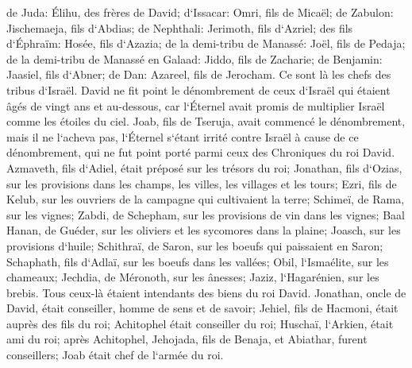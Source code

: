 \verse de Juda: Élihu, des frères de David; d`Issacar: Omri, fils de Micaël; 
\verse de Zabulon: Jischemaeja, fils d`Abdias; de Nephthali: Jerimoth, fils d`Azriel; 
\verse des fils d`Éphraïm: Hosée, fils d`Azazia; de la demi-tribu de Manassé: Joël, fils de Pedaja; 
\verse de la demi-tribu de Manassé en Galaad: Jiddo, fils de Zacharie; de Benjamin: Jaasiel, fils d`Abner; 
\verse de Dan: Azareel, fils de Jerocham. Ce sont là les chefs des tribus d`Israël. 
\verse David ne fit point le dénombrement de ceux d`Israël qui étaient âgés de vingt ans et au-dessous, car l`Éternel avait promis de multiplier Israël comme les étoiles du ciel. 
\verse Joab, fils de Tseruja, avait commencé le dénombrement, mais il ne l`acheva pas, l`Éternel s`étant irrité contre Israël à cause de ce dénombrement, qui ne fut point porté parmi ceux des Chroniques du roi David. 
\verse Azmaveth, fils d`Adiel, était préposé sur les trésors du roi; Jonathan, fils d`Ozias, sur les provisions dans les champs, les villes, les villages et les tours; 
\verse Ezri, fils de Kelub, sur les ouvriers de la campagne qui cultivaient la terre; 
\verse Schimeï, de Rama, sur les vignes; Zabdi, de Schepham, sur les provisions de vin dans les vignes; 
\verse Baal Hanan, de Guéder, sur les oliviers et les sycomores dans la plaine; Joasch, sur les provisions d`huile; 
\verse Schithraï, de Saron, sur les boeufs qui paissaient en Saron; Schaphath, fils d`Adlaï, sur les boeufs dans les vallées; 
\verse Obil, l`Ismaélite, sur les chameaux; Jechdia, de Méronoth, sur les ânesses; 
\verse Jaziz, l`Hagarénien, sur les brebis. Tous ceux-là étaient intendants des biens du roi David. 
\verse Jonathan, oncle de David, était conseiller, homme de sens et de savoir; Jehiel, fils de Hacmoni, était auprès des fils du roi; 
\verse Achitophel était conseiller du roi; Huschaï, l`Arkien, était ami du roi; 
\verse après Achitophel, Jehojada, fils de Benaja, et Abiathar, furent conseillers; Joab était chef de l`armée du roi. 

\chapter{}

